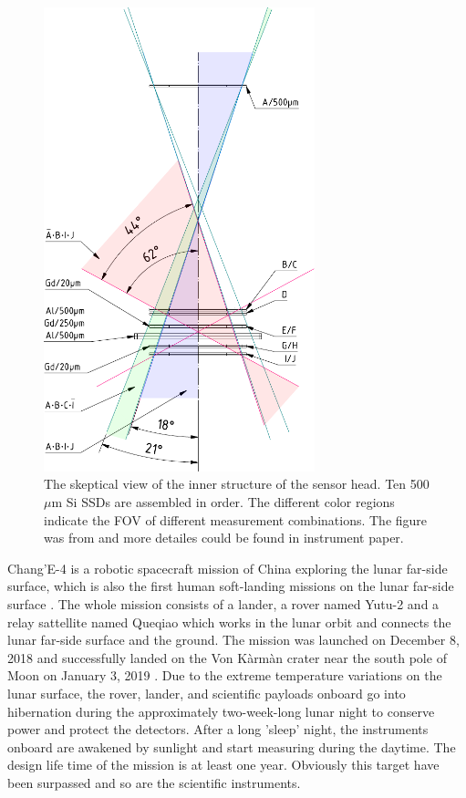 \begin{figure}
    \centering
    \includegraphics[width = 0.7\textwidth, height = 0.5 \textheight]{images/change4_lnd-c9_trigger-cones-colored.pdf}
    \caption[The inner structure of LND sensor head]{The skeptical view of the inner structure of the sensor head. Ten 500 $\mu$m Si \acp{SSD} are assembled in order. The different color regions indicate the \ac{FOV} of different measurement combinations. The figure was from \citet{Wimmer-2020-LND} and more detailes could be found in instrument paper.}
    \label{Fig:LND_sensor_head}
\end{figure}
Chang'E-4 is a robotic spacecraft mission of China exploring the lunar far-side surface, which is also the first human soft-landing missions on the lunar far-side surface \citep{Li2021SSRv}. The whole mission consists of a lander, a rover named Yutu-2 and a relay sattellite named Queqiao which works in the lunar orbit and connects the lunar far-side surface and the ground. The mission was launched on December 8, 2018 and successfully landed on the Von K\`arm\`an crater near the south pole of Moon on January 3, 2019 \citep{Wu2019NatGe}. Due to the extreme temperature variations on the lunar surface, the rover, lander, and scientific payloads onboard go into hibernation during the approximately two-week-long lunar night to conserve power and protect the detectors.  After a long 'sleep' night, the instruments onboard are awakened by sunlight and start measuring during the daytime. The design life time of the mission is at least one year. Obviously this target have been surpassed and so are the scientific instruments.

